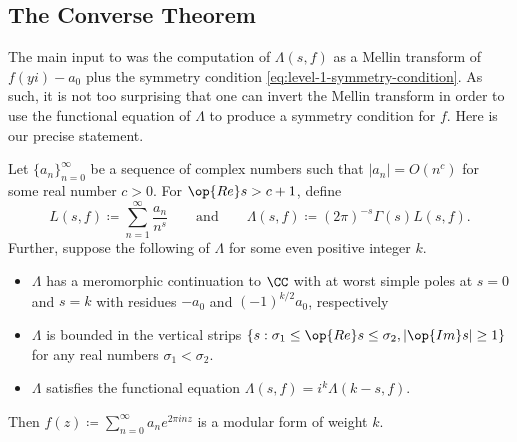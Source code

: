\documentclass{amsart}
\begin{document}
\subsection{The Converse Theorem}
The main input to  was the computation of $\Lambda(s,f)$ as a Mellin transform of $f(yi)-a_0$ plus the symmetry condition \eqref{eq:level-1-symmetry-condition}. As such, it is not too surprising that one can invert the Mellin transform in order to use the functional equation of $\Lambda$ to produce a symmetry condition for $f$. Here is our precise statement.
\begin{theorem}[Hecke]
	Let $\{a_n\}_{n=0}^\infty$ be a sequence of complex numbers such that $|a_n|=O\left(n^c\right)$ for some real number $c>0$. For $\op{Re}s>c+1$, define
	\[L(s,f)\coloneqq\sum_{n=1}^\infty\frac{a_n}{n^s}\qquad\text{and}\qquad\Lambda(s,f)\coloneqq(2\pi)^{-s}\Gamma(s)L(s,f).\]
	Further, suppose the following of $\Lambda$ for some even positive integer $k$.
	\begin{itemize}
		\item $\Lambda$ has a meromorphic continuation to $\CC$ with at worst simple poles at $s=0$ and $s=k$ with residues $-a_0$ and $(-1)^{k/2}a_0$, respectively
		\item $\Lambda$ is bounded in the vertical strips $\{s:\sigma_1\le\op{Re}s\le\sigma_2,\left|\op{Im}s\right|\ge1\}$ for any real numbers $\sigma_1<\sigma_2$.
		\item $\Lambda$ satisfies the functional equation $\Lambda(s,f)=i^k\Lambda(k-s,f)$.
	\end{itemize}
	Then $f(z)\coloneqq\sum_{n=0}^\infty a_ne^{2\pi inz}$ is a modular form of weight $k$.
\end{theorem}
\end{document}
